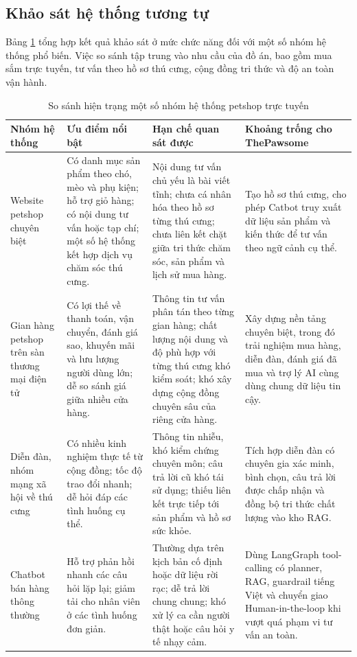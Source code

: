 \documentclass[../DoAn.tex]{subfiles}
\begin{document}
\subsection{Khảo sát hệ thống tương tự}
\label{subsection:2.1.2}

Bảng \ref{table:2.1} tổng hợp kết quả khảo sát ở mức chức năng đối với một số nhóm hệ thống phổ biến. Việc so sánh tập trung vào nhu cầu của đồ án, bao gồm mua sắm trực tuyến, tư vấn theo hồ sơ thú cưng, cộng đồng tri thức và độ an toàn vận hành.

\begin{table}[H]
\centering
\small
\setlength{\tabcolsep}{4pt}
\renewcommand{\arraystretch}{1.35}
\caption{So sánh hiện trạng một số nhóm hệ thống petshop trực tuyến}
\label{table:2.1}
\begin{tabular}{|p{2.5cm}|p{3.55cm}|p{3.65cm}|p{3.55cm}|}
\hline
\textbf{Nhóm hệ thống} & \textbf{Ưu điểm nổi bật} & \textbf{Hạn chế quan sát được} & \textbf{Khoảng trống cho ThePawsome} \\ \hline
Website petshop chuyên biệt & Có danh mục sản phẩm theo chó, mèo và phụ kiện; hỗ trợ giỏ hàng; có nội dung tư vấn hoặc tạp chí; một số hệ thống kết hợp dịch vụ chăm sóc thú cưng. & Nội dung tư vấn chủ yếu là bài viết tĩnh; chưa cá nhân hóa theo hồ sơ từng thú cưng; chưa liên kết chặt giữa tri thức chăm sóc, sản phẩm và lịch sử mua hàng. & Tạo hồ sơ thú cưng, cho phép Catbot truy xuất dữ liệu sản phẩm và kiến thức để tư vấn theo ngữ cảnh cụ thể. \\ \hline
Gian hàng petshop trên sàn thương mại điện tử & Có lợi thế về thanh toán, vận chuyển, đánh giá sao, khuyến mãi và lưu lượng người dùng lớn; dễ so sánh giá giữa nhiều cửa hàng. & Thông tin tư vấn phân tán theo từng gian hàng; chất lượng nội dung và độ phù hợp với từng thú cưng khó kiểm soát; khó xây dựng cộng đồng chuyên sâu của riêng cửa hàng. & Xây dựng nền tảng chuyên biệt, trong đó trải nghiệm mua hàng, diễn đàn, đánh giá đã mua và trợ lý AI cùng dùng chung dữ liệu tin cậy. \\ \hline
Diễn đàn, nhóm mạng xã hội về thú cưng & Có nhiều kinh nghiệm thực tế từ cộng đồng; tốc độ trao đổi nhanh; dễ hỏi đáp các tình huống cụ thể. & Thông tin nhiễu, khó kiểm chứng chuyên môn; câu trả lời cũ khó tái sử dụng; thiếu liên kết trực tiếp tới sản phẩm và hồ sơ sức khỏe. & Tích hợp diễn đàn có chuyên gia xác minh, bình chọn, câu trả lời được chấp nhận và đồng bộ tri thức chất lượng vào kho RAG. \\ \hline
Chatbot bán hàng thông thường & Hỗ trợ phản hồi nhanh các câu hỏi lặp lại; giảm tải cho nhân viên ở các tình huống đơn giản. & Thường dựa trên kịch bản cố định hoặc dữ liệu rời rạc; dễ trả lời chung chung; khó xử lý ca cần người thật hoặc câu hỏi y tế nhạy cảm. & Dùng LangGraph tool-calling có planner, RAG, guardrail tiếng Việt và chuyển giao Human-in-the-loop khi vượt quá phạm vi tư vấn an toàn. \\ \hline
\end{tabular}
\end{table}
\end{document}

